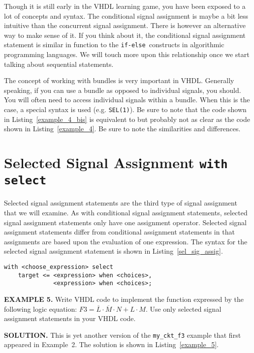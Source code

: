 Though it is still early in the VHDL learning game, you have been exposed to a lot of concepts and syntax. The conditional signal assignment is maybe a bit less intuitive than the concurrent signal assignment. There is however an alternative way to make sense of it. If you think about it, the conditional signal assignment statement is similar in function to the \texttt{if-else }constructs in algorithmic programming languages. We will touch more upon this relationship once we start talking about sequential statements.

The concept of working with bundles is very important in VHDL. Generally speaking, if you can use a bundle as opposed to individual signals, you should. You will often need to access individual signals within a bundle. When this is the case, a special syntax is used (e.g. \texttt{SEL(1)}). Be sure to note that the code shown in Listing~\ref{example_4_bis} is equivalent to but probably not as clear as the code shown in Listing~\ref{example_4}. Be sure to note the similarities and differences.

\section{Selected Signal Assignment \texttt{with select}}
Selected signal assignment statements are the third type of signal assignment that we will examine. As with conditional signal assignment statements, selected signal assignment statements only have one assignment operator. Selected signal assignment statements differ from conditional assignment statements in that assignments are based upon the evaluation of one expression. The syntax for the selected signal assignment statement is shown in Listing~\ref{sel_sig_assig}.

\noindent
\begin{minipage}{0.99\linewidth}
\begin{lstlisting}[label=sel_sig_assig, caption=Syntax for the selected signal assignment statement.]
with <choose_expression> select
	target <= <expression> when <choices>,
	          <expression> when <choices>;
\end{lstlisting}
\end{minipage}

\begin{leftbar}
\noindent
\textbf{EXAMPLE 5.}
Write VHDL code to implement the function expressed by the following logic equation: $F3=\overline{L} \cdot \overline{M} \cdot N+L \cdot M$. Use only selected signal assignment statements in your VHDL code.
\end{leftbar}
\noindent
\textbf{SOLUTION.} This is yet another version of the \texttt{my\_ckt\_f3} example that first appeared in Example~2. The solution is shown in Listing~\ref{example_5}.

